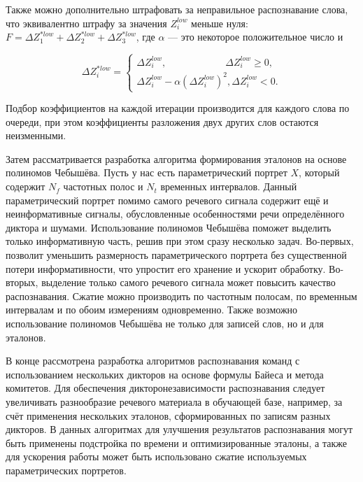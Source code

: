 Также можно дополнительно штрафовать за неправильное распознавание слова, что эквивалентно штрафу за значения $Z^{low}_{i}$ меньше нуля: $F = \Delta Z^{*low}_{1} + \Delta Z^{*low}_{2} + \Delta Z^{*low}_{3}$, где $\alpha$ --- это некоторое положительное число и

\begin{equation}
\Delta Z^{*low}_{i} = \left\{
\begin{array}{ll}
	\Delta Z^{low}_{i}, \qquad\qquad\qquad \Delta Z^{low}_{i} \ge 0,\\
	\Delta Z^{low}_{i} - \alpha (\Delta Z^{low}_{i})^2, \Delta Z^{low}_{i} < 0.
\end{array}
\right.
\end{equation}

Подбор коэффициентов на каждой итерации производится для каждого слова по очереди, при этом коэффициенты разложения двух других слов остаются неизменными.

Затем рассматривается разработка алгоритма формирования эталонов на основе полиномов Чебышёва.
Пусть у нас есть параметрический портрет $X$, который содержит $N_f$ частотных полос и $N_t$ временных интервалов.
Данный параметрический портрет помимо самого речевого сигнала содержит ещё и неинформативные сигналы, обусловленные особенностями речи определённого диктора и шумами.
Использование полиномов Чебышёва поможет выделить только информативную часть, решив при этом сразу несколько задач.
Во-первых, позволит уменьшить размерность параметрического портрета без существенной потери информативности, что упростит его хранение и ускорит обработку.
Во-вторых, выделение только самого речевого сигнала может повысить качество распознавания.
Сжатие можно производить по частотным полосам, по временным интервалам и по обоим измерениям одновременно.
Также возможно использование полиномов Чебышёва не только для записей слов, но и для эталонов.

В конце рассмотрена разработка алгоритмов распознавания команд с использованием нескольких дикторов на основе формулы Байеса и метода комитетов.
Для обеспечения дикторонезависимости распознавания следует увеличивать разнообразие речевого материала в обучающей базе, например, за счёт применения нескольких эталонов, сформированных по записям разных дикторов.
В данных алгоритмах для улучшения результатов распознавания могут быть применены подстройка по времени и оптимизированные эталоны, а также для ускорения работы может быть использовано сжатие используемых параметрических портретов.

